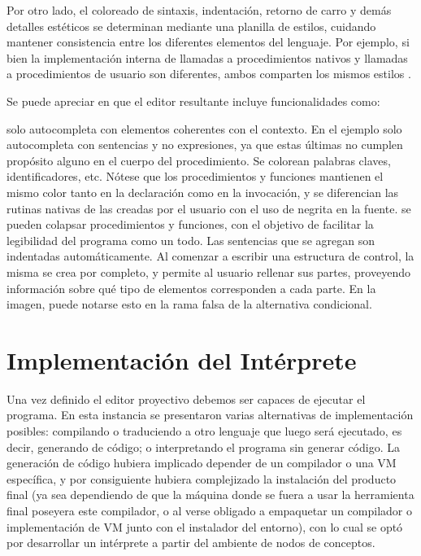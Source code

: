 \centertree{
  [BinaryOperation
    [{Plus(alias='+')}]
    [{Div(alias='/')}]
    [...]
  ]  
}

Por otro lado, el coloreado de sintaxis, indentación, retorno de carro y demás detalles estéticos se determinan mediante una planilla de estilos, cuidando mantener consistencia entre los diferentes elementos del lenguaje. Por ejemplo, si bien la implementación interna de llamadas a procedimientos nativos y llamadas a procedimientos de usuario son diferentes, ambos comparten los mismos estilos .


Se puede apreciar en  que el editor resultante incluye funcionalidades como:
\begin{itemize}
 solo autocompleta con elementos coherentes con el contexto. En el ejemplo solo autocompleta con sentencias y no expresiones, ya que estas últimas no cumplen propósito alguno en el cuerpo del procedimiento.
 Se colorean palabras claves, identificadores, etc. Nótese que los procedimientos y funciones mantienen el mismo color tanto en la declaración como en la invocación, y se diferencian las rutinas nativas de las creadas por el usuario con el uso de negrita en la fuente.
 se pueden colapsar procedimientos y funciones, con el objetivo de facilitar la legibilidad del programa como un todo.
 Las sentencias que se agregan son indentadas automáticamente.
 Al comenzar a escribir una estructura de control, la misma se crea por completo, y permite al usuario rellenar sus partes, proveyendo información sobre qué tipo de elementos corresponden a cada parte. En la imagen, puede notarse esto en la rama falsa de la alternativa condicional.
\end{itemize}




\section{Implementación del Intérprete}\label{interprete}

Una vez definido el editor proyectivo debemos ser capaces de ejecutar el programa. En esta instancia se presentaron varias alternativas de implementación posibles: compilando o traduciendo a otro lenguaje que luego será ejecutado, es decir, generando de código; o interpretando el programa sin generar código. La generación de código hubiera implicado depender de un compilador o una VM específica, y por consiguiente hubiera complejizado la instalación del producto final (ya sea dependiendo de que la máquina donde se fuera a usar la herramienta final poseyera este compilador, o al verse obligado a empaquetar un compilador o implementación de VM junto con el instalador del entorno), con lo cual se optó por desarrollar un intérprete a partir del ambiente de nodos de conceptos.

